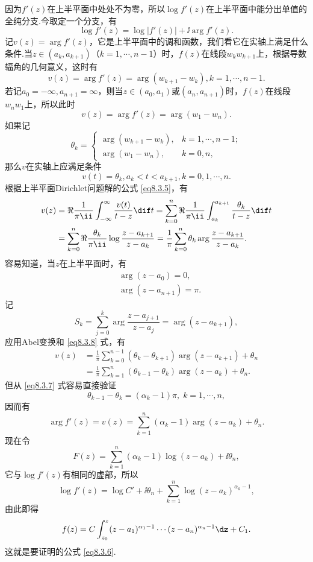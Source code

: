 因为$f'(z)$在上半平面中处处不为零，所以$\log f'(z)$在上半平面中能分出单值的全纯分支.今取定一个分支，有
\[\log f'(z)=\log|f'(z)|+\ii\arg f'(z).\]
记$v(z)=\arg f'(z)$，它是上半平面中的调和函数，我们看它在实轴上满足什么条件.当$z\in(a_k,a_{k+1})$（$k=1,\cdots,n-1$）时，$f(z)$在线段$w_kw_{k+1}$上，根据导数辐角的几何意义，这时有
\[v(z)=\arg f'(z)=\arg (w_{k+1}-w_k),k=1,\cdots,n-1.\]
若记$a_0=-\infty,a_{n+1}=\infty$，则当$z\in(a_0,a_1)$或$(a_n,a_{n+1})$时，$f(z)$在线段$w_nw_1$上，所以此时
\[v(z)=\arg f'(z)=\arg(w_1-w_n).\]
如果记
\begin{equation}\label{eq8.3.7}
\theta_k=\begin{cases}
\arg(w_{k+1}-w_k),&k=1,\cdots,n-1;\\
\arg(w_1-w_n),&k=0,n,
\end{cases}
\end{equation}
那么$v$在实轴上应满足条件
\[v(t)=\theta_k,a_k<t<a_{k+1},k=0,1,\cdots,n.\]
根据上半平面Dirichlet问题解的公式 \eqref{eq8.3.5}，有
\begin{align*}
v(z)&=\Re\frac1{\pi\ii}\int_{-\infty}^\infty\frac{v(t)}{t-z}\dif t
=\sum_{k=0}^n\Re\frac1{\pi\ii}\int_{a_k}^{a_{k+1}}\frac{\theta_k}{t-z}\dif t\\
&=\sum_{k=0}^n\Re\frac{\theta_k}{\pi\ii}\log\frac{z-a_{k+1}}{z-a_k}
=\frac1\pi\sum_{k=0}^n\theta_k\arg\frac{z-a_{k+1}}{z-a_k}.
\end{align*}
容易知道，当$z$在上半平面时，有
\begin{equation}\label{eq8.3.8}
\begin{aligned}
&\arg(z-a_0)=0,\\
&\arg(z-a_{n+1})=\pi.
\end{aligned}
\end{equation}
记
\[S_k=\sum_{j=0}^k\arg\frac{z-a_{j+1}}{z-a_j}=\arg(z-a_{k+1}),\]
应用Abel变换和 \eqref{eq8.3.8} 式，有
\begin{align*}
v(z)&=\frac1\pi\sum_{k=0}^{n-1}(\theta_k-\theta_{k+1})\arg(z-a_{k+1})+\theta_n\\
&=\frac1\pi\sum_{k=1}^n(\theta_{k-1}-\theta_k)\arg(z-a_k)+\theta_n.
\end{align*}
但从 \eqref{eq8.3.7} 式容易直接验证
\[\theta_{k-1}-\theta_k=(\alpha_k-1)\pi,\;k=1,\cdots,n,\]
因而有
\[\arg f'(z)=v(z)=\sum_{k=1}^n(\alpha_k-1)\arg(z-a_k)+\theta_n.\]
现在令
\[F(z)=\sum_{k=1}^n(\alpha_k-1)\log(z-a_k)+\ii\theta_n,\]
它与$\log f'(z)$有相同的虚部，所以
\[\log f'(z)=\log C'+\ii\theta_n+\sum_{k=1}^n\log(z-a_k)^{\alpha_k-1},\]
由此即得
\begin{equation*}
f(z)=C\int_{z_0}^z(z-a_1)^{\alpha_1-1}\cdots(z-a_n)^{\alpha_n-1}\dz+C_1.
\end{equation*}
这就是要证明的公式 \eqref{eq8.3.6}.

